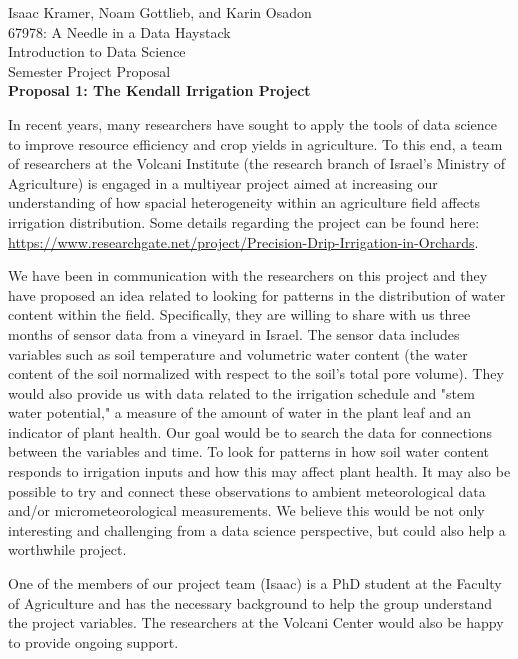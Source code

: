 \documentclass[11pt]{article}
\begin{document}
\setlength{\parskip}{0.5em}
\raggedright

    Isaac Kramer, Noam Gottlieb, and Karin Osadon \\ 67978: A Needle in a Data Haystack \\ Introduction to Data Science \\ Semester Project Proposal \\ \vspace{0.5cm}
  \textbf{Proposal 1: The Kendall Irrigation Project}

In recent years, many researchers have sought to apply the tools of data science to improve resource efficiency and crop yields in agriculture. To this end, a team of researchers at the Volcani Institute (the research branch of Israel's Ministry of Agriculture) is engaged in a multiyear project aimed at increasing our understanding of how spacial heterogeneity within an agriculture field affects irrigation distribution. Some details regarding the project can be found here: \url{https://www.researchgate.net/project/Precision-Drip-Irrigation-in-Orchards}.

We have been in communication with the researchers on this project and they have proposed an idea related to looking for patterns in the distribution of water content within the field. Specifically, they are willing to share with us three months of sensor data from a vineyard in Israel. The sensor data includes variables such as soil temperature and volumetric water content (the water content of the soil normalized with respect to the soil's total pore volume). They would also provide us with data related to the irrigation schedule and "stem water potential," a measure of the amount of water in the plant leaf and an indicator of plant health. Our goal would be to search the data for connections between the variables and time. To look for patterns in how soil water content responds to irrigation inputs and how this may affect plant health. It may also be possible to try and connect these observations to ambient meteorological data and/or micrometeorological measurements. We believe this would be not only interesting and challenging from a data science perspective, but could also help a worthwhile project.

One of the members of our project team (Isaac) is a PhD student at the Faculty of Agriculture and has the necessary background to help the group understand the project variables. The researchers at the Volcani Center would also be happy to provide ongoing support.
\vspace{0.2cm}
\end{document}
